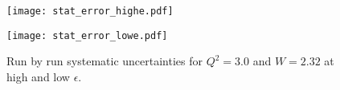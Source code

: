 \begin{figure}
  \centering
  \begin{minipage}[b]{0.48\linewidth}
    \texttt{[image: stat\_error\_highe.pdf]}
  \end{minipage}
  \hfill
  \begin{minipage}[b]{0.48\linewidth}
    \texttt{[image: stat\_error\_lowe.pdf]}
  \end{minipage}
  
  \caption{Run by run systematic uncertainties for $Q^2=3.0$ and $W=2.32$ at high and low $\epsilon$.}
  \label{fig:7-1_stat_error_data}
\end{figure}

